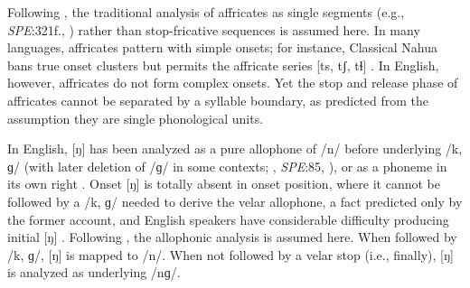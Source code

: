 Following \citet{Pierrehumbert1994}, the traditional analysis of affricates as single segments (e.g., \emph{SPE}:321f., \citealp[24]{Jakobson1961}) rather than stop-fricative sequences \citep[e.g.,][]{Hualde1988,Lombardi1990} is assumed here. In many languages, affricates pattern with simple onsets; for instance, Classical Nahua bans true onset clusters but permits the affricate series [ts, tʃ, tɬ] \citep[9]{Launey2011}. In English, however, affricates do not form complex onsets. Yet the stop and release phase of affricates cannot be separated by a syllable boundary, as predicted from the assumption they are single phonological units.

In English, [ŋ] has been analyzed as a pure allophone of /n/ before underlying /k, ɡ/ (with later deletion of /ɡ/ in some contexts; \citealt[65f.]{Borowsky1986}, \emph{SPE}:85, \citealt[62]{Halle1985a}), or as a phoneme in its own right \citep[e.g.,][]{Jusczyk2002,Sapir1925}. Onset [ŋ] is totally absent in onset position, where it cannot be followed by a /k, ɡ/ needed to derive the velar allophone, a fact predicted only by the former account, and English speakers have considerable difficulty producing initial [ŋ] \citep{Rusaw2009}. Following \citet{Pierrehumbert1994}, the allophonic analysis is assumed here. When followed by /k, ɡ/, [ŋ] is mapped to /n/. When not followed by a velar stop (i.e., finally), [ŋ] is analyzed as underlying /nɡ/.

